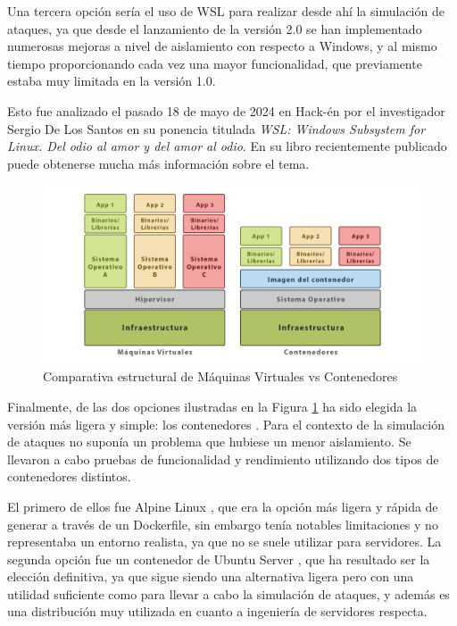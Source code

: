 Una tercera opción sería el uso de \gls{WSL} para realizar desde ahí la simulación de ataques, ya que desde el lanzamiento de la versión 2.0 se han implementado numerosas mejoras a nivel de aislamiento con respecto a Windows, y al mismo tiempo proporcionando cada vez una mayor funcionalidad, que previamente estaba muy limitada en la versión 1.0. 

Esto fue analizado el pasado 18 de mayo de 2024 en Hack-én por el investigador Sergio De Los Santos en su ponencia titulada \textit{\gls{WSL}: Windows Subsystem for Linux. Del odio al amor y del amor al odio}. En su libro recientemente publicado \cite{santos_wsl_2024} puede obtenerse mucha más información sobre el tema. 


\begin{figure}[H]
    \centering
    \includegraphics[width=1.1\linewidth]{imagenes/vms-vs-containers.png}
    \caption{Comparativa estructural de Máquinas Virtuales vs Contenedores}
    \label{fig:vm-vs-container}
\end{figure}

Finalmente, de las dos opciones ilustradas en la Figura \ref{fig:vm-vs-container} ha sido elegida la versión más ligera y simple: los contenedores \cite{vms_vs_containers}. Para el contexto de la simulación de ataques no suponía un problema que hubiese un menor aislamiento. Se llevaron a cabo pruebas de funcionalidad y rendimiento utilizando dos tipos de contenedores distintos.

El primero de ellos fue Alpine Linux \cite{alpine_linux}, que era la opción más ligera y rápida de generar a través de un Dockerfile, sin embargo tenía notables limitaciones y no representaba un entorno realista, ya que no se suele utilizar para servidores. La segunda opción fue un contenedor de Ubuntu Server \cite{ubuntu_server}, que ha resultado ser la elección definitiva, ya que sigue siendo una alternativa ligera pero con una utilidad suficiente como para llevar a cabo la simulación de ataques, y además es una distribución muy utilizada en cuanto a ingeniería de servidores respecta.

